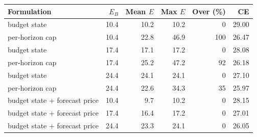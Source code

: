 \begin{tabular}{lrrrrr}
\toprule
Formulation & $E_B$ & Mean $E$ & Max $E$ & Over (\%) & CE\\
\midrule
budget state & 10.4 & 10.2 & 10.2 & 0 & 29.00\\
per-horizon cap & 10.4 & 22.8 & 46.9 & 100 & 26.47\\
budget state & 17.4 & 17.1 & 17.2 & 0 & 28.08\\
per-horizon cap & 17.4 & 25.2 & 47.2 & 92 & 26.18\\
budget state & 24.4 & 24.1 & 24.1 & 0 & 27.10\\
per-horizon cap & 24.4 & 22.6 & 34.3 & 35 & 25.97\\
budget state + forecast price & 10.4 & 9.7 & 10.2 & 0 & 28.15\\
budget state + forecast price & 17.4 & 16.4 & 17.2 & 0 & 27.01\\
budget state + forecast price & 24.4 & 23.3 & 24.1 & 0 & 26.05\\
\bottomrule
\end{tabular}
